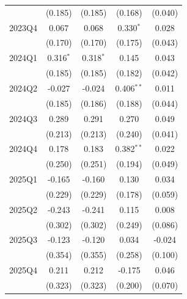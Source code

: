 \begin{table}[htbp]
\begin{tabular}{lcccc}
 & (0.185) & (0.185) & (0.168) & (0.040) \\
2023Q4 & 0.067 & 0.068 & 0.330$^{*}$ & 0.028 \\
 & (0.170) & (0.170) & (0.175) & (0.043) \\
2024Q1 & 0.316$^{*}$ & 0.318$^{*}$ & 0.145 & 0.043 \\
 & (0.185) & (0.185) & (0.182) & (0.042) \\
2024Q2 & -0.027 & -0.024 & 0.406$^{**}$ & 0.011 \\
 & (0.185) & (0.186) & (0.188) & (0.044) \\
2024Q3 & 0.289 & 0.291 & 0.270 & 0.049 \\
 & (0.213) & (0.213) & (0.240) & (0.041) \\
2024Q4 & 0.178 & 0.183 & 0.382$^{**}$ & 0.022 \\
 & (0.250) & (0.251) & (0.194) & (0.049) \\
2025Q1 & -0.165 & -0.160 & 0.130 & 0.034 \\
 & (0.229) & (0.229) & (0.178) & (0.059) \\
2025Q2 & -0.243 & -0.241 & 0.115 & 0.008 \\
 & (0.302) & (0.302) & (0.249) & (0.086) \\
2025Q3 & -0.123 & -0.120 & 0.034 & -0.024 \\
 & (0.354) & (0.355) & (0.258) & (0.100) \\
2025Q4 & 0.211 & 0.212 & -0.175 & 0.046 \\
 & (0.323) & (0.323) & (0.200) & (0.070) \\
\bottomrule
\end{tabular}
\par\vspace{2pt}{\footnotesize Reference quarter 2022Q3 omitted. Standard errors clustered on occupation in parentheses. * p<0.10, ** p<0.05, *** p<0.01.}
\end{table}
